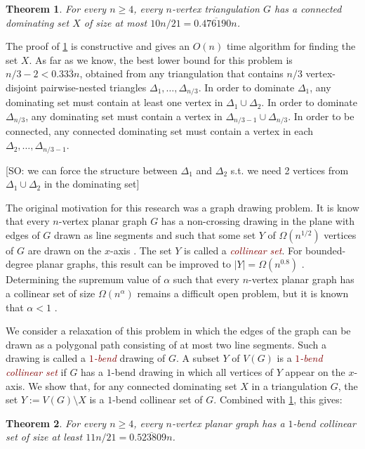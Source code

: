 \documentclass[12pt]{article}
\newtheorem{thm}{Theorem}
\newcommand{\defin}[1]{\emph{\textcolor{Maroon}{#1}}}
\theoremstyle{definition}
\newcommand{\saeed}[1]{[{\color{blue}SO: #1}]}
\begin{document}
\begin{thm}\label{main_result2}
  For every $n\ge 4$, every $n$-vertex triangulation $G$ has a connected dominating set $X$ of size at most $10n/21= 0.\overline{476190}n$.
\end{thm}

The proof of \cref{main_result2} is constructive and gives an $O(n)$ time algorithm for finding the set $X$.  As far as we know, the best lower bound for this problem is $n/3-2 < 0.33\overline{3} n$, obtained from any triangulation that contains $n/3$ vertex-disjoint pairwise-nested triangles $\Delta_1,\ldots,\Delta_{n/3}$.  In order to dominate $\Delta_1$, any dominating set must contain at least one vertex in $\Delta_1 \cup \Delta_2$. In order to dominate $\Delta_{n/3}$, any dominating set must contain a vertex in $\Delta_{n/3-1}\cup\Delta_{n/3}$.  In order to be connected, any connected dominating set must contain a vertex in each $\Delta_2,\ldots,\Delta_{n/3-1}$.

\saeed{we can force the structure between $\Delta_1$ and $\Delta_2$ s.t. we need 2 vertices from $\Delta_1 \cup \Delta_2$ in the dominating set}


The original motivation for this research was a graph drawing problem.  It is know that every $n$-vertex planar graph $G$ has a non-crossing drawing in the plane with edges of $G$ drawn as line segments and such that some set $Y$ of $\Omega(n^{1/2})$ vertices of $G$ are drawn on the $x$-axis \cite{bose.dujmovic:polynomial,dujmovic:utility}.  The set $Y$ is called a \defin{collinear set}.  For bounded-degree planar graphs, this result can be improved to $|Y|=\Omega(n^{0.8})$ \cite{dujmovic.morin:dual}.  Determining the supremum value of $\alpha$ such that every $n$-vertex planar graph has a collinear set of size $\Omega(n^{\alpha})$ remains a difficult open problem, but it is known that $\alpha < 1$ \cite{ravsky.verbitsky:collinear}.

We consider a relaxation of this problem in which the edges of the graph can be drawn as a polygonal path consisting of at most two line segments.  Such a drawing is called a \defin{$1$-bend} drawing of $G$.  A subset $Y$ of $V(G)$ is a \defin{$1$-bend collinear set} if $G$ has a $1$-bend drawing in which all vertices of $Y$ appear on the $x$-axis.  We show that, for any connected dominating set $X$ in a triangulation $G$, the set $Y:=V(G)\setminus X$ is a $1$-bend collinear set of $G$.  Combined with \cref{main_result2}, this gives:

\begin{thm}\label{one_bend_collinear}
  For every $n\ge 4$, every $n$-vertex planar graph has a $1$-bend collinear set of size at least $11n/21=0.\overline{523809}n$.
\end{thm}
\end{document}
